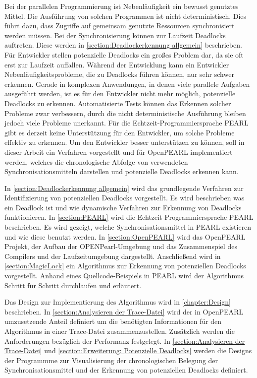 Bei der parallelen Programmierung ist Nebenläufigkeit ein bewusst genutztes
Mittel. Die Ausführung von solchen Programmen ist nicht deterministisch. Dies
führt dazu, dass Zugriffe auf gemeinsam genutzte Ressourcen synchronisiert
werden müssen. Bei der Synchronisierung können zur Laufzeit Deadlocks auftreten.
Diese werden in \cref{section:Deadlockerkennung allgemein} beschrieben. Für
Entwickler stellen potenzielle Deadlocks ein großes Problem dar, da sie oft erst
zur Laufzeit auffallen. Während der Entwicklung kann ein Entwickler
Nebenläufigkeitsprobleme, die zu Deadlocks führen können, nur sehr schwer
erkennen. Gerade in komplexen Anwendungen, in denen viele parallele Aufgaben
ausgeführt werden, ist es für den Entwickler nicht mehr möglich, potenzielle
Deadlocks zu erkennen. Automatisierte Tests können das Erkennen solcher Probleme
zwar verbessern, durch die nicht deterministische Ausführung bleiben jedoch
viele Probleme unerkannt. Für die Echtzeit-Programmiersprache PEARL gibt es
derzeit keine Unterstützung für den Entwickler, um solche Probleme effektiv zu
erkennen. Um den Entwickler besser unterstützen zu können, soll in dieser Arbeit
ein Verfahren vorgestellt und für OpenPEARL implementiert werden, welches die
chronologische Abfolge von verwendeten Synchronisationsmitteln darstellen und
potenzielle Deadlocks erkennen kann. 

In \cref{section:Deadlockerkennung allgemein} wird das grundlegende Verfahren
zur Identifizierung von potenziellen Deadlocks vorgestellt. Es wird beschrieben
was ein Deadlock ist und wie dynamische Verfahren zur Erkennung von Deadlocks
funktionieren. In \cref{section:PEARL} wird die Echtzeit-Programmiersprache
PEARL beschrieben. Es wird gezeigt, welche Synchronisationsmittel in PEARL
existieren und wie diese benutzt werden. In \cref{section:OpenPEARL} wird das
OpenPEARL Projekt, der Aufbau der OPENPearl-Umgebung und das Zusammenspiel des
Compilers und der Laufzeitumgebung dargestellt. Anschließend wird in
\cref{section:MagicLock} ein Algorithmus zur Erkennung von potenziellen
Deadlocks vorgestellt. Anhand eines Quellcode-Beispiels in PEARL wird der
Algorithmus Schritt für Schritt durchlaufen und erläutert. 

Das Design zur Implementierung des Algorithmus wird in \cref{chapter:Design}
beschrieben. In \cref{section:Analysieren der Trace-Datei} wird der in OpenPEARL
umzusetzende Anteil definiert um die benötigten Informationen für den
Algorithmus in einer Trace-Datei zusammenzustellen. Zusätzlich werden die
Anforderungen bezüglich der Performanz festgelegt. In \cref{section:Analysieren
der Trace-Datei} und \cref{section:Erweiterung: Potenzielle Deadlocks} werden
die Designs der Programmme zur Visualisierung der chronologischen Belegung der
Synchronisationsmittel und der Erkennung von potenziellen Deadlocks definiert.

